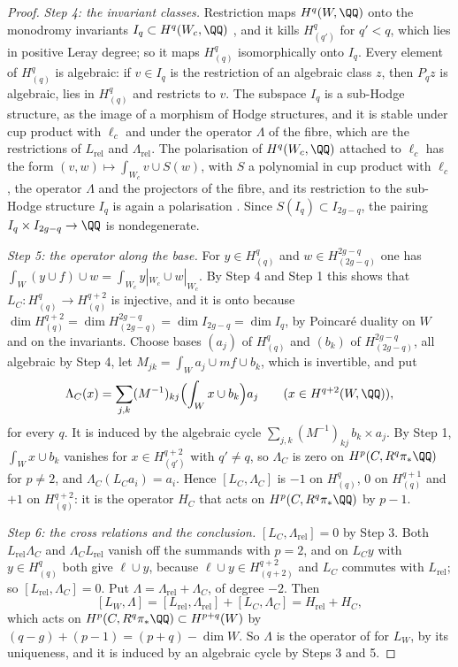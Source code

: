 \begin{proof}
\emph{Step 4: the invariant classes.} Restriction maps $H^{q}(W,\QQ)$ onto the
monodromy invariants $I_{q}\subset H^{q}(W_{c},\QQ)$ \cite[4.1.1(ii)]{Del71},
and it kills $H^{q}_{(q')}$ for $q'<q$, which lies in positive Leray degree;
so it maps $H^{q}_{(q)}$ isomorphically onto $I_{q}$. Every element of
$H^{q}_{(q)}$ is algebraic: if $v\in I_{q}$ is the restriction of an algebraic
class $z$, then $P_{q}z$ is algebraic, lies in $H^{q}_{(q)}$ and restricts to
$v$. The subspace $I_{q}$ is a sub-Hodge structure, as the image of a
morphism of Hodge structures, and it is stable under cup product with
$\ell_{c}$ and under the operator $\Lambda$ of the fibre, which are the
restrictions of $L_{\mathrm{rel}}$ and $\Lambda_{\mathrm{rel}}$. The
polarisation of $H^{q}(W_{c},\QQ)$ attached to $\ell_{c}$ has the form
$(v,w)\mapsto\int_{W_{c}}v\cup S(w)$, with $S$ a polynomial in cup product
with $\ell_{c}$, the operator $\Lambda$ and the projectors of the fibre, and
its restriction to the sub-Hodge structure $I_{q}$ is again a polarisation
\cite{Voi02}. Since $S(I_{q})\subset I_{2g-q}$, the pairing
$I_{q}\times I_{2g-q}\to\QQ$ is nondegenerate.

\emph{Step 5: the operator along the base.} For $y\in H^{q}_{(q)}$ and
$w\in H^{2g-q}_{(2g-q)}$ one has $\int_{W}(y\cup f)\cup w=\int_{W_{c}}
y|_{W_{c}}\cup w|_{W_{c}}$. By Step 4 and Step 1 this shows that
$L_{C}\colon H^{q}_{(q)}\to H^{q+2}_{(q)}$ is injective, and it is onto
because $\dim H^{q+2}_{(q)}=\dim H^{2g-q}_{(2g-q)}=\dim I_{2g-q}=\dim I_{q}$,
by Poincar\'e duality on $W$ and on the invariants. Choose bases $(a_{j})$ of
$H^{q}_{(q)}$ and $(b_{k})$ of $H^{2g-q}_{(2g-q)}$, all algebraic by Step 4,
let $M_{jk}=\int_{W}a_{j}\cup mf\cup b_{k}$, which is invertible, and put
\[
  \Lambda_{C}(x)=\sum_{j,k}(M^{-1})_{kj}\Bigl(\int_{W}x\cup b_{k}\Bigr)a_{j}
  \qquad(x\in H^{q+2}(W,\QQ)),
\]
for every $q$. It is induced by the algebraic cycle
$\sum_{j,k}(M^{-1})_{kj}\,b_{k}\times a_{j}$. By Step 1, $\int_{W}x\cup b_{k}$
vanishes for $x\in H^{q+2}_{(q')}$ with $q'\ne q$, so $\Lambda_{C}$ is zero
on $H^{p}(C,R^{q}\pi_{*}\QQ)$ for $p\ne2$, and $\Lambda_{C}(L_{C}a_{i})=a_{i}$.
Hence $[L_{C},\Lambda_{C}]$ is $-1$ on $H_{(q)}^{q}$, $0$ on
$H_{(q)}^{q+1}$ and $+1$ on $H_{(q)}^{q+2}$: it is the operator $H_{C}$ that
acts on $H^{p}(C,R^{q}\pi_{*}\QQ)$ by $p-1$.

\emph{Step 6: the cross relations and the conclusion.} $[L_{C},
\Lambda_{\mathrm{rel}}]=0$ by Step 3. Both $L_{\mathrm{rel}}\Lambda_{C}$ and
$\Lambda_{C}L_{\mathrm{rel}}$ vanish off the summands with $p=2$, and on
$L_{C}y$ with $y\in H^{q}_{(q)}$ both give $\ell\cup y$, because
$\ell\cup y\in H^{q+2}_{(q+2)}$ and $L_{C}$ commutes with $L_{\mathrm{rel}}$;
so $[L_{\mathrm{rel}},\Lambda_{C}]=0$. Put
$\Lambda=\Lambda_{\mathrm{rel}}+\Lambda_{C}$, of degree $-2$. Then
\[
  [L_{W},\Lambda]=[L_{\mathrm{rel}},\Lambda_{\mathrm{rel}}]+[L_{C},\Lambda_{C}]
  =H_{\mathrm{rel}}+H_{C},
\]
which acts on $H^{p}(C,R^{q}\pi_{*}\QQ)\subset H^{p+q}(W)$ by
$(q-g)+(p-1)=(p+q)-\dim W$. So $\Lambda$ is the operator of \cite[Definition~10.6]{paperI}
for $L_{W}$, by its uniqueness, and it is induced by an algebraic cycle by
Steps 3 and 5.
\end{proof}


